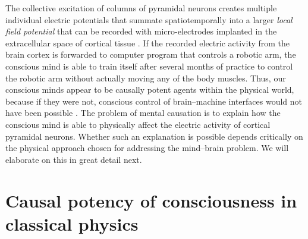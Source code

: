 \documentclass{ws-ijmpb}
\begin{document}
The collective excitation of columns of pyramidal neurons creates
multiple individual electric potentials that summate spatiotemporally into
a larger \emph{local field potential} that can be recorded with micro-electrodes
\cite{Long2021} implanted in the extracellular space of cortical
tissue \cite{Hwang2009,Hochberg2006}. If the recorded electric activity
from the brain cortex is forwarded to computer program that controls
a robotic arm, the conscious mind is able to train itself after several
months of practice to control the robotic arm without actually moving
any of the body muscles. Thus, our conscious minds appear to be causally
potent agents within the physical world, because if they were not,
conscious control of brain--machine interfaces would not have been
possible \cite{Georgiev2017,Georgiev2021c}. The problem of mental causation is
to explain how the conscious mind is able to physically affect the
electric activity of cortical pyramidal neurons. Whether such an explanation
is possible depends critically on the physical approach chosen for
addressing the mind--brain problem. We will elaborate on this in great detail next.


\section{Causal potency of consciousness in classical physics}
\label{sec:3}
\end{document}
